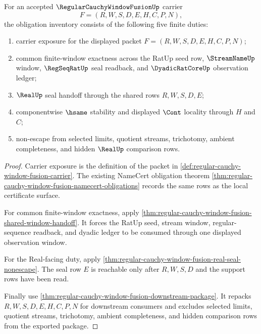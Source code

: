 \begin{theorem}
\label{thm:regular-cauchy-window-fusion-obligation-inventory}
For an accepted $\RegularCauchyWindowFusionUp$ carrier
$$
F=(R,W,S,D,E,H,C,P,N),
$$
the obligation inventory consists of the following five finite duties:
\begin{enumerate}
\item carrier exposure for the displayed packet $F=(R,W,S,D,E,H,C,P,N)$;
\item common finite-window exactness across the RatUp seed row, $\StreamNameUp$ window, $\RegSeqRatUp$ seal readback, and $\DyadicRatCoreUp$ observation ledger;
\item $\RealUp$ seal handoff through the shared rows $R,W,S,D,E$;
\item componentwise $\hsame$ stability and displayed $\Cont$ locality through $H$ and $C$;
\item non-escape from selected limits, quotient streams, trichotomy, ambient completeness, and hidden $\RealUp$ comparison rows.
\end{enumerate}
\end{theorem}
\begin{proof}
Carrier exposure is the definition of the packet in \autoref{def:regular-cauchy-window-fusion-carrier}. The existing NameCert obligation theorem \autoref{thm:regular-cauchy-window-fusion-namecert-obligations} records the same rows as the local certificate surface.

For common finite-window exactness, apply \autoref{thm:regular-cauchy-window-fusion-shared-window-handoff}. It forces the RatUp seed, stream window, regular-sequence readback, and dyadic ledger to be consumed through one displayed observation window.

For the Real-facing duty, apply \autoref{thm:regular-cauchy-window-fusion-real-seal-nonescape}. The seal row $E$ is reachable only after $R,W,S,D$ and the support rows have been read.

Finally use \autoref{thm:regular-cauchy-window-fusion-downstream-package}. It repacks $R,W,S,D,E,H,C,P,N$ for downstream consumers and excludes selected limits, quotient streams, trichotomy, ambient completeness, and hidden comparison rows from the exported package.
\end{proof}

